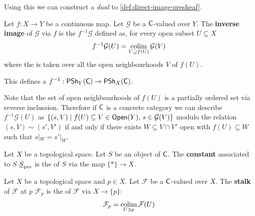 \documentclass[../main.tex]{subfiles}
\begin{document}
Using this we can construct a \textit{dual}  to \autoref{def:direct-image-presheaf}.
\begin{definition} \label{def:inverse-image-presheaf}
  Let \(f: X \to Y\) be a continuous map.
  Let \(\mathcal{G}\) be a \(\mathsf{C}\)-valued  over \(Y\).
  The \textbf{inverse image } of \(\mathcal{G}\) via \(f\) is the  \(f^{-1}\mathcal{G}\) defined as, for every open subset \(U \subseteq X\)
  \begin{equation*}
    f^{-1}\mathcal{G}(U) = \operatorname*{colim}_{V \supseteq f(U)} \mathcal{G}(V)
  \end{equation*}
  where the  is taken over all the open neighbourhoods \(V\) of \(f(U)\).

  This defines a  \(f^{-1}: \mathsf{PSh}_{Y}(\mathsf{C}) \to \mathsf{PSh}_{X}(\mathsf{C})\).
\end{definition}

\begin{remark}
  Note that the set of open neighbourhoods of \(f(U)\) is a partially ordered set via reverse inclussion.
  Therefore if \(\mathsf{C}\) is a concrete category we can describe \(f^{-1}\mathcal{G}(U)\) as \(\{(s, V) \mid f(U) \subseteq V \in \mathsf{Open}(Y),\, s \in \mathcal{G}(V)\}\) modulo the relation \((s, V) \sim (s', V')\) if and only if there exists \(W \subseteq V \cap V'\) open with \(f(U) \subseteq W\) such that \(s|_{W} = s'|_{W}\).
\end{remark}

\begin{example} \label{ex:constant-presheaf}
  Let \(X\) be a topological space.
  Let \(S\) be an object of \(\mathsf{C}\).
  The \textbf{constant } associated to \(S\) \(\underline{S}_{\operatorname*{pre}}\) is the  of \(S\) via the map \(\{\ast\} \to X\).
\end{example}

\begin{definition}[Stalk] \label{def:stalk-presheaf}
  Let \(X\) be a topological space and \(p \in X\).
  Let \(\mathcal{F}\) be a \(\mathsf{C}\)-valued  over \(X\).
  The \textbf{stalk} of \(\mathcal{F}\) at \(p\) \(\mathcal{F}_{p}\) is the  of \(\mathcal{F}\) via \(X \to \{p\}\):
  \begin{equation*}
    \mathcal{F}_{p} = \operatorname*{colim}_{U \ni p} \mathcal{F}(U)
  \end{equation*}
\end{definition}
\end{document}
